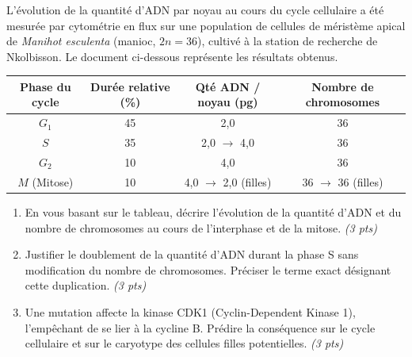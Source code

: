 \documentclass[11pt]{article}
\begin{document}
\begin{exercice}
L'évolution de la quantité d'ADN par noyau au cours du cycle cellulaire a été mesurée par cytométrie en flux sur une population de cellules de méristème apical de \textit{Manihot esculenta} (manioc, $2n = 36$), cultivé à la station de recherche de Nkolbisson. Le document ci-dessous représente les résultats obtenus.
\begin{center}
\begin{tabular}{|c|c|c|c|}
\hline
\textbf{Phase du cycle} & \textbf{Durée relative (\%)} & \textbf{Qté ADN / noyau (pg)} & \textbf{Nombre de chromosomes} \\
\hline
$G_1$ & 45 & 2,0 & 36 \\
$S$ & 35 & 2,0 $\to$ 4,0 & 36 \\
$G_2$ & 10 & 4,0 & 36 \\
$M$ (Mitose) & 10 & 4,0 $\to$ 2,0 (filles) & 36 $\to$ 36 (filles) \\
\hline
\end{tabular}
\end{center}
\begin{enumerate}
    \item En vous basant sur le tableau, décrire l'évolution de la quantité d'ADN et du nombre de chromosomes au cours de l'interphase et de la mitose. \textit{(3 pts)}
    \item Justifier le doublement de la quantité d'ADN durant la phase S sans modification du nombre de chromosomes. Préciser le terme exact désignant cette duplication. \textit{(3 pts)}
    \item Une mutation affecte la kinase CDK1 (Cyclin-Dependent Kinase 1), l'empêchant de se lier à la cycline B. Prédire la conséquence sur le cycle cellulaire et sur le caryotype des cellules filles potentielles. \textit{(3 pts)}
\end{enumerate}
\end{exercice}
\end{document}
